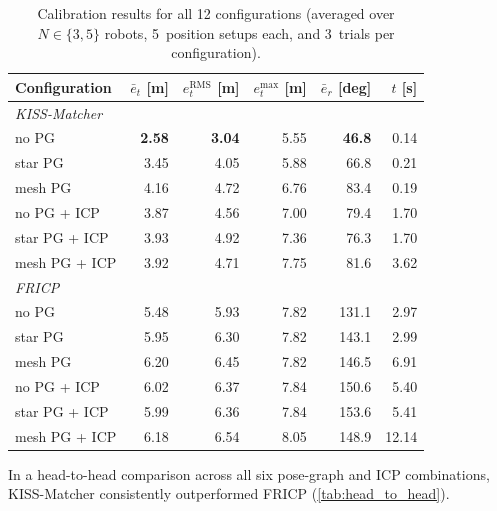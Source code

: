 \begin{table}[htbp]
    \centering
    \caption{Calibration results for all 12 configurations
             (averaged over $N \in \{3, 5\}$ robots, 5~position setups
             each, and 3~trials per configuration).}
    \label{tab:results_overview}
    \small
    \begin{tabular}{l r r r r r}
        \toprule
        \textbf{Configuration}
            & $\bar{e}_t$ [m]
            & $e_t^\mathrm{RMS}$ [m]
            & $e_t^\mathrm{max}$ [m]
            & $\bar{e}_r$ [deg]
            & $t$ [s] \\
        \midrule
        \multicolumn{6}{l}{\textit{KISS-Matcher}} \\
        \quad no PG             & \textbf{2.58}  & \textbf{3.04}  & 5.55
                                & \textbf{46.8}  & 0.14 \\
        \quad star PG           & 3.45  & 4.05  & 5.88  & 66.8  & 0.21 \\
        \quad mesh PG           & 4.16  & 4.72  & 6.76  & 83.4  & 0.19 \\
        \quad no PG + ICP       & 3.87  & 4.56  & 7.00  & 79.4  & 1.70 \\
        \quad star PG + ICP     & 3.93  & 4.92  & 7.36  & 76.3  & 1.70 \\
        \quad mesh PG + ICP     & 3.92  & 4.71  & 7.75  & 81.6  & 3.62 \\
        \midrule
        \multicolumn{6}{l}{\textit{FRICP}} \\
        \quad no PG             & 5.48  & 5.93  & 7.82  & 131.1 & 2.97 \\
        \quad star PG           & 5.95  & 6.30  & 7.82  & 143.1 & 2.99 \\
        \quad mesh PG           & 6.20  & 6.45  & 7.82  & 146.5 & 6.91 \\
        \quad no PG + ICP       & 6.02  & 6.37  & 7.84  & 150.6 & 5.40 \\
        \quad star PG + ICP     & 5.99  & 6.36  & 7.84  & 153.6 & 5.41 \\
        \quad mesh PG + ICP     & 6.18  & 6.54  & 8.05  & 148.9 & 12.14 \\
        \bottomrule
    \end{tabular}
\end{table}

In a head-to-head comparison across all six pose-graph and ICP
combinations, KISS-Matcher consistently outperformed FRICP
(\autoref{tab:head_to_head}).

